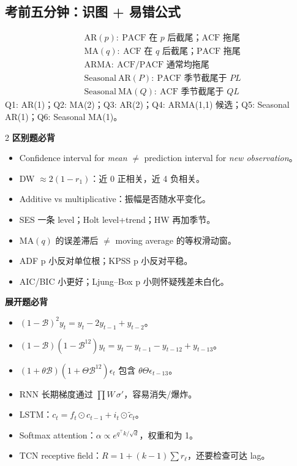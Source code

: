 \documentclass[UTF8,fontset=fandol,10.5pt,a4paper]{ctexart}
\begin{document}
\subsection{考前五分钟：识图 + 易错公式}
\begin{keybox}[title={识图口诀 / 最终答案卡}]
\begin{align*}
&\boxed{\mathrm{AR}(p):\ \mathrm{PACF}\text{ 在 }p\text{ 后截尾；ACF 拖尾}}\\
&\boxed{\mathrm{MA}(q):\ \mathrm{ACF}\text{ 在 }q\text{ 后截尾；PACF 拖尾}}\\
&\boxed{\mathrm{ARMA}:\ \mathrm{ACF/PACF}\text{ 通常均拖尾}}\\
&\boxed{\mathrm{Seasonal\ AR}(P):\ \mathrm{PACF}\text{ 季节截尾于 }PL}\\
&\boxed{\mathrm{Seasonal\ MA}(Q):\ \mathrm{ACF}\text{ 季节截尾于 }QL}
\end{align*}
Q1: AR(1)；Q2: MA(2)；Q3: AR(2)；Q4: ARMA(1,1) 候选；Q5: Seasonal AR(1)；Q6: Seasonal MA(1)。
\end{keybox}
\begin{multicols}{2}
\textbf{区别题必背}\par
\begin{itemize}
\item Confidence interval for \emph{mean} $\ne$ prediction interval for \emph{new observation}。
\item DW $\approx 2(1-r_1)$：近 0 正相关，近 4 负相关。
\item Additive vs multiplicative：振幅是否随水平变化。
\item SES 一条 level；Holt level+trend；HW 再加季节。
\item MA$(q)$ 的误差滞后 $\ne$ moving average 的等权滑动窗。
\item ADF p 小反对单位根；KPSS p 小反对平稳。
\item AIC/BIC 小更好；Ljung--Box p 小则怀疑残差未白化。
\end{itemize}
\columnbreak
\textbf{展开题必背}\par
\begin{itemize}
\item $(1-\mathcal B)^2y_t=y_t-2y_{t-1}+y_{t-2}$。
\item $(1-\mathcal B)(1-\mathcal B^{12})y_t=y_t-y_{t-1}-y_{t-12}+y_{t-13}$。
\item $(1+\theta\mathcal B)(1+\Theta\mathcal B^{12})\epsilon_t$ 包含 $\theta\Theta\epsilon_{t-13}$。
\item RNN 长期梯度通过 $\prod W\,\sigma'$，容易消失/爆炸。
\item LSTM：$c_t=f_t\odot c_{t-1}+i_t\odot\tilde c_t$。
\item Softmax attention：$\alpha\propto e^{q^\top k/\sqrt d}$，权重和为 1。
\item TCN receptive field：$R=1+(k-1)\sum r_\ell$，还要检查可达 lag。
\end{itemize}
\end{multicols}
\end{document}
